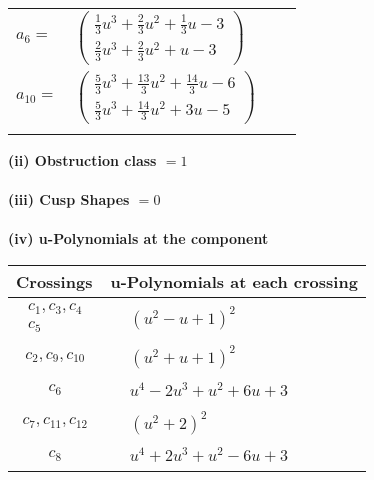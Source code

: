 \documentclass[1p]{elsarticle_modified}
\theoremstyle{definition}
\begin{document}
\begin{tabular}{m{7pt} m{180pt} m{7pt} m{180pt} }
\flushright $a_{6}=$&$\begin{pmatrix}\frac{1}{3} u^3+\frac{2}{3} u^2+\frac{1}{3} u-3\\\frac{2}{3} u^3+\frac{2}{3} u^2+u-3\end{pmatrix}$ \\
\flushright $a_{10}=$&$\begin{pmatrix}\frac{5}{3} u^3+\frac{13}{3} u^2+\frac{14}{3} u-6\\\frac{5}{3} u^3+\frac{14}{3} u^2+3 u-5\end{pmatrix}$\\&\end{tabular}
\flushleft \textbf{(ii) Obstruction class $= 1$}\\~\\
\flushleft \textbf{(iii) Cusp Shapes $= 0$}\\~\\
\newpage\renewcommand{\arraystretch}{1}
\flushleft \textbf{(iv) u-Polynomials at the component}\newline \\
\begin{tabular}{m{50pt}|m{274pt}}
Crossings & \hspace{64pt}u-Polynomials at each crossing \\
\hline $$\begin{aligned}c_{1},c_{3},c_{4}\\c_{5}\end{aligned}$$&$\begin{aligned}
&(u^2- u+1)^2
\end{aligned}$\\
\hline $$\begin{aligned}c_{2},c_{9},c_{10}\end{aligned}$$&$\begin{aligned}
&(u^2+u+1)^2
\end{aligned}$\\
\hline $$\begin{aligned}c_{6}\end{aligned}$$&$\begin{aligned}
&u^4-2 u^3+u^2+6 u+3
\end{aligned}$\\
\hline $$\begin{aligned}c_{7},c_{11},c_{12}\end{aligned}$$&$\begin{aligned}
&(u^2+2)^2
\end{aligned}$\\
\hline $$\begin{aligned}c_{8}\end{aligned}$$&$\begin{aligned}
&u^4+2 u^3+u^2-6 u+3
\end{aligned}$\\
\hline
\end{tabular}\\~\\
\end{document}
